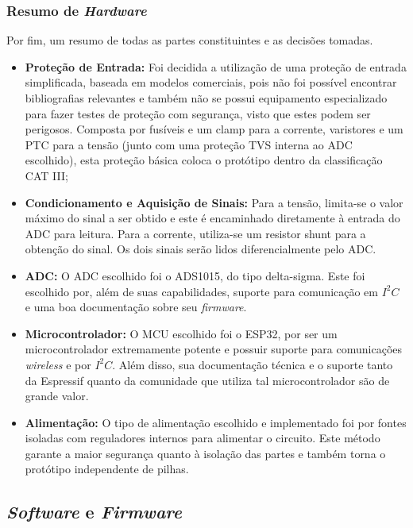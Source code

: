 \subsubsection{Resumo de \textit{Hardware}}\label{resumo-hardware}

Por fim, um resumo de todas as partes constituintes e as decisões tomadas.

\begin{itemize}
    \item \textbf{Proteção de Entrada:} Foi decidida a utilização de uma proteção de entrada simplificada, baseada em modelos comerciais, pois não foi possível encontrar bibliografias relevantes e também não se possui equipamento especializado para fazer testes de proteção com segurança, visto que estes podem ser perigosos. Composta por fusíveis e um clamp para a corrente, varistores e um PTC para a tensão (junto com uma proteção TVS interna ao ADC escolhido), esta proteção básica coloca o protótipo dentro da classificação CAT III;
    \item \textbf{Condicionamento e Aquisição de Sinais:} Para a tensão, limita-se o valor máximo do sinal a ser obtido e este é encaminhado diretamente à entrada do ADC para leitura. Para a corrente, utiliza-se um resistor shunt para a obtenção do sinal. Os dois sinais serão lidos diferencialmente pelo ADC.
    \item \textbf{ADC:} O ADC escolhido foi o ADS1015, do tipo delta-sigma. Este foi escolhido por, além de suas capabilidades, suporte para comunicação em $I^2C$ e uma boa documentação sobre seu \textit{firmware}.
    \item \textbf{Microcontrolador:} O MCU escolhido foi o ESP32, por ser um microcontrolador extremamente potente e possuir suporte para comunicações \textit{wireless} e por $I^2C$. Além disso, sua documentação técnica e o suporte tanto da Espressif quanto da comunidade que utiliza tal microcontrolador são de grande valor.
    \item \textbf{Alimentação:} O tipo de alimentação escolhido e implementado foi por fontes isoladas com reguladores internos para alimentar o circuito. Este método garante a maior segurança quanto à isolação das partes e também torna o protótipo independente de pilhas.
\end{itemize}

\subsection{\textit{Software} e \textit{Firmware}}\label{softfirm}

